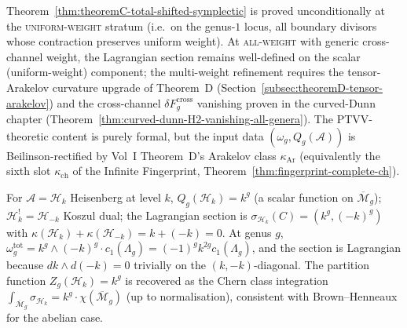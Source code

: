 \documentclass[11pt]{article}
\begin{document}
\begin{remark}
\label{rem:theoremC-total-scope}
Theorem~\ref{thm:theoremC-total-shifted-symplectic} is proved
unconditionally at the \textsc{uniform-weight} stratum (i.e.\ on
the genus-$1$ locus, all boundary divisors whose contraction
preserves uniform weight). At \textsc{all-weight} with generic
cross-channel weight, the Lagrangian section remains well-defined
on the scalar (uniform-weight) component; the multi-weight
refinement requires the tensor-Arakelov curvature upgrade of
Theorem~D (Section~\ref{subsec:theoremD-tensor-arakelov}) and the
cross-channel $\delta F_g^{\mathrm{cross}}$ vanishing proven in
the curved-Dunn chapter
(Theorem~\ref{thm:curved-dunn-H2-vanishing-all-genera}). The
PTVV-theoretic content is purely formal, but the input data
$(\omega_g, Q_g(\mathcal{A}))$ is Beilinson-rectified by Vol~I
Theorem~D's Arakelov class $\kappa_{\mathrm{Ar}}$ (equivalently
the sixth slot $\kappa_{\mathrm{ch}}$ of the Infinite Fingerprint,
Theorem~\ref{thm:fingerprint-complete-ch}).
\end{remark}

\begin{example}
\label{ex:theoremC-heisenberg}
For $\mathcal{A} = \mathcal{H}_k$ Heisenberg at level $k$,
$Q_g(\mathcal{H}_k) = k^g$ (a scalar function on
$\overline{\mathcal{M}}_g$); $\mathcal{H}_k^! = \mathcal{H}_{-k}$
Koszul dual; the Lagrangian section is
$\sigma_{\mathcal{H}_k}(C) = (k^g, (-k)^g)$ with
$\kappa(\mathcal{H}_k) + \kappa(\mathcal{H}_{-k}) = k + (-k) = 0$.
At genus $g$, $\omega^{\mathrm{tot}}_g = k^g \wedge (-k)^g \cdot
c_1(\Lambda_g) = (-1)^g k^{2g} c_1(\Lambda_g)$, and the section is
Lagrangian because $dk \wedge d(-k) = 0$ trivially on the
$(k,-k)$-diagonal. The partition function
$Z_g(\mathcal{H}_k) = k^g$ is recovered as the Chern class
integration $\int_{\overline{\mathcal{M}}_g} \sigma_{\mathcal{H}_k}
= k^g \cdot \chi(\overline{\mathcal{M}}_g)$ (up to normalisation),
consistent with Brown--Henneaux for the abelian case.
\end{example}
\end{document}
